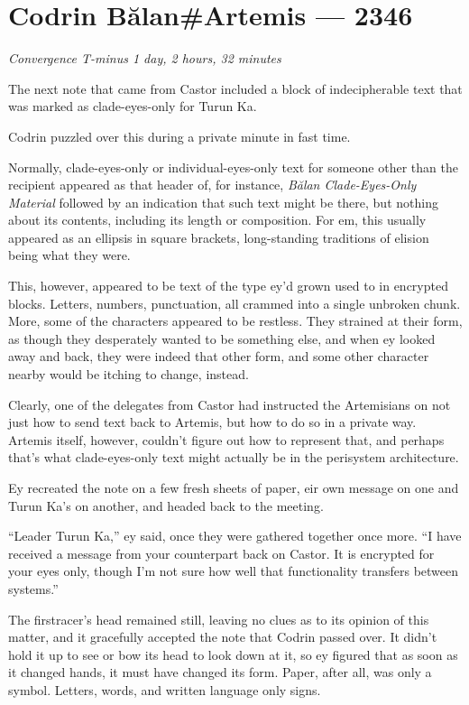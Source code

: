 \hypertarget{codrin-bux103lanartemis-2346}{%
\chapter{Codrin Bălan\#Artemis — 2346}}

\begin{center}
\emph{Convergence T-minus 1 day, 2 hours, 32 minutes}
\end{center}

\noindent The next note that came from Castor included a block of indecipherable text that was marked as clade-eyes-only for Turun Ka.

Codrin puzzled over this during a private minute in fast time.

Normally, clade-eyes-only or individual-eyes-only text for someone other than the recipient appeared as that header of, for instance, \emph{Bălan Clade-Eyes-Only Material} followed by an indication that such text might be there, but nothing about its contents, including its length or composition. For em, this usually appeared as an ellipsis in square brackets, long-standing traditions of elision being what they were.

This, however, appeared to be text of the type ey'd grown used to in encrypted blocks. Letters, numbers, punctuation, all crammed into a single unbroken chunk. More, some of the characters appeared to be restless. They strained at their form, as though they desperately wanted to be something else, and when ey looked away and back, they were indeed that other form, and some other character nearby would be itching to change, instead.

Clearly, one of the delegates from Castor had instructed the Artemisians on not just how to send text back to Artemis, but how to do so in a private way. Artemis itself, however, couldn't figure out how to represent that, and perhaps that's what clade-eyes-only text might actually be in the perisystem architecture.

Ey recreated the note on a few fresh sheets of paper, eir own message on one and Turun Ka's on another, and headed back to the meeting.

``Leader Turun Ka,'' ey said, once they were gathered together once more. ``I have received a message from your counterpart back on Castor. It is encrypted for your eyes only, though I'm not sure how well that functionality transfers between systems.''

The firstracer's head remained still, leaving no clues as to its opinion of this matter, and it gracefully accepted the note that Codrin passed over. It didn't hold it up to see or bow its head to look down at it, so ey figured that as soon as it changed hands, it must have changed its form. Paper, after all, was only a symbol. Letters, words, and written language only signs.


